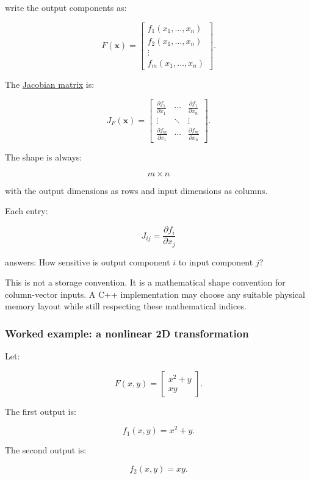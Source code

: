 write the output components as:

\[
F(\mathbf x)= \begin{bmatrix} f_1(x_1,\ldots,x_n)\\ f_2(x_1,\ldots,x_n)\\ \vdots\\ f_m(x_1,\ldots,x_n) \end{bmatrix}.
\]

The \hyperref[02-foundations-ii-ch021-jacobians-curvature-and-local-approximation]{Jacobian matrix} is:

\[
\boxed{ J_F(\mathbf x)= \begin{bmatrix} \frac{\partial f_1}{\partial x_1}&\cdots& \frac{\partial f_1}{\partial x_n}\\ \vdots&\ddots&\vdots\\ \frac{\partial f_m}{\partial x_1}&\cdots& \frac{\partial f_m}{\partial x_n} \end{bmatrix} }.
\]

The shape is always:

\[
\boxed{m\times n}
\]

with the output dimensions as rows and input dimensions as columns.

Each entry:

\[
J_{ij}=\frac{\partial f_i}{\partial x_j}
\]

answers: How sensitive is output component \(i\) to input component \(j\)?

This is not a storage convention. It is a mathematical shape convention for column-vector inputs. A C++ implementation may choose any suitable physical memory layout while still respecting these mathematical indices.

\subsubsection{Worked example: a nonlinear 2D transformation}\label{02-foundations-ii-ch021-worked-example-a-nonlinear-2d-transformation}

Let:

\[
F(x,y)= \begin{bmatrix} x^2+y\\ xy \end{bmatrix}.
\]

The first output is:

\[
f_1(x,y)=x^2+y.
\]

The second output is:

\[
f_2(x,y)=xy.
\]

